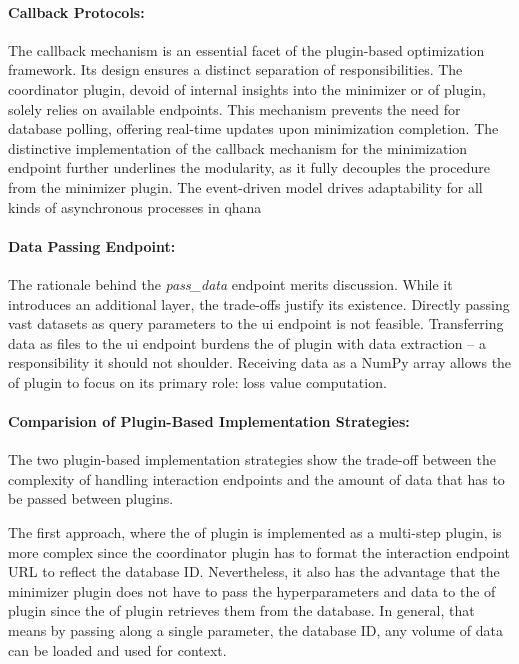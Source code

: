 \documentclass[
  a4paper,  %
  twoside,  %
  bibliography=totoc,
  headsepline,
  cleardoublepage=empty,
  parskip=half,
  draft=false
]{scrbook}
\begin{document}
\paragraph{Callback Protocols:}
\label{sec:callackMechanism}

The callback mechanism is an essential facet of the plugin-based optimization framework.
Its design ensures a distinct separation of responsibilities.
The coordinator plugin, devoid of internal insights into the minimizer or \gls{of} plugin, solely relies on available endpoints.
This mechanism prevents the need for database polling, offering real-time updates upon minimization completion.
The distinctive implementation of the callback mechanism for the minimization endpoint further underlines the modularity, as it fully decouples the procedure from the minimizer plugin.
The event-driven model drives adaptability for all kinds of asynchronous processes in \gls{qhana}

\paragraph{Data Passing Endpoint:}
\label{sec:passDataEndpoint}

The rationale behind the \emph{pass\_data} endpoint merits discussion.
While it introduces an additional layer, the trade-offs justify its existence.
Directly passing vast datasets as query parameters to the \gls{ui} endpoint is not feasible.
Transferring data as files to the \gls{ui} endpoint burdens the \gls{of} plugin with data extraction – a responsibility it should not shoulder.
Receiving data as a NumPy array allows the \gls{of} plugin to focus on its primary role: loss value computation.

\paragraph{Comparision of Plugin-Based Implementation Strategies:}
\label{par:differencesBetweenTheTwoPluginBasedImplementationApproaches}

The two plugin-based implementation strategies show the trade-off between the complexity of handling interaction endpoints and the amount of data that has to be passed between plugins.

The first approach, where the \gls{of} plugin is implemented as a multi-step plugin, is more complex since the coordinator plugin has to format the interaction endpoint URL to reflect the database ID.
Nevertheless, it also has the advantage that the minimizer plugin does not have to pass the hyperparameters and data to the \gls{of} plugin since the \gls{of} plugin retrieves them from the database.
In general, that means by passing along a single parameter, the database ID, any volume of data can be loaded and used for context.
\end{document}
